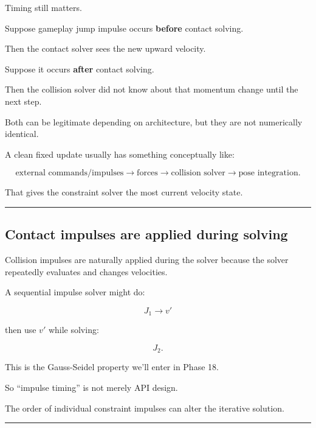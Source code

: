 \hypertarget{06-engine-ii-ch038-timing-within-a-fixed-step}{}

Timing still matters.

Suppose gameplay jump impulse occurs \textbf{before} contact solving.

Then the contact solver sees the new upward velocity.

Suppose it occurs \textbf{after} contact solving.

Then the collision solver did not know about that momentum change until the next step.

Both can be legitimate depending on architecture, but they are not numerically identical.

A clean fixed update usually has something conceptually like:

\[
\text{external commands/impulses}
\rightarrow
\text{forces}
\rightarrow
\text{collision solver}
\rightarrow
\text{pose integration}.
\]

That gives the constraint solver the most current velocity state.

\begin{center}\rule{0.5\linewidth}{0.5pt}\end{center}

\subsection{Contact impulses are applied during solving}\label{06-engine-ii-ch038-contact-impulses-are-applied-during-solving}

\hypertarget{06-engine-ii-ch038-contact-impulses-are-applied-during-solving}{}

Collision impulses are naturally applied during the solver because the solver repeatedly evaluates and changes velocities.

A sequential impulse solver might do:

\[
J_1
\rightarrow
v'
\]

then use \(v'\) while solving:

\[
J_2.
\]

This is the Gauss-Seidel property we'll enter in Phase 18.

So ``impulse timing'' is not merely API design.

The order of individual constraint impulses can alter the iterative solution.

\begin{center}\rule{0.5\linewidth}{0.5pt}\end{center}

